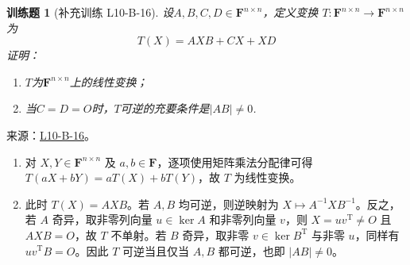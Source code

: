 \documentclass[12pt,fontset=fandol]{ctexart}
\newtheorem{exercise}{训练题}[section]
\begin{document}
\begin{exercise}[补充训练 L10-B-16]\label{prob:L10-B-16}
设$A,B,C,D \in \mathbf{F}^{n \times n}$，定义变换 $ T : \mathbf{F}^{n \times n} \to \mathbf{F}^{n \times n}$ 为
        \[ T(X) = AXB+CX+XD \]
        证明：
        \begin{enumerate}
            \item $T$为$\mathbf{F}^{n \times n}$上的线性变换；

            \item 当$C=D=O$时，$T$可逆的充要条件是$|AB| \neq 0$.
        \end{enumerate}
\end{exercise}
\noindent 来源：\href{https://github.com/yhwu-is/Linear-Algebra-Left-Undone/blob/new/%E8%AE%B2%E4%B9%89/%E4%B8%93%E9%A2%98/10%20%E8%A1%8C%E5%88%97%E5%BC%8F.tex}{L10-B-16}。
\begin{solve}
\begin{enumerate}
\item 对 $X,Y\in\mathbf F^{n\times n}$ 及 $a,b\in\mathbf F$，逐项使用矩阵乘法分配律可得 $T(aX+bY)=aT(X)+bT(Y)$，故 $T$ 为线性变换。
\item 此时 $T(X)=AXB$。若 $A,B$ 均可逆，则逆映射为 $X\mapsto A^{-1}XB^{-1}$。反之，若 $A$ 奇异，取非零列向量 $u\in\ker A$ 和非零列向量 $v$，则 $X=uv^{\mathrm T}\ne O$ 且 $AXB=O$，故 $T$ 不单射。若 $B$ 奇异，取非零 $v\in\ker B^{\mathrm T}$ 与非零 $u$，同样有 $uv^{\mathrm T}B=O$。因此 $T$ 可逆当且仅当 $A,B$ 都可逆，也即 $|AB|\ne0$。\end{enumerate}
\end{solve}
\end{document}
